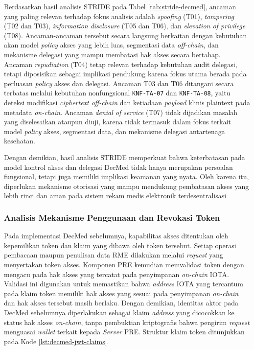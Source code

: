 \documentclass[bahasa, 12pt, a4paper, onecolumn, oneside, final]{report}
\begin{document}
Berdasarkan hasil analisis STRIDE pada Tabel \ref{tab:stride-decmed}, ancaman yang paling relevan terhadap fokus analisis adalah \textit{spoofing} (T01), \textit{tampering} (T02 dan T03), \textit{information disclosure} (T05 dan T06), dan \textit{elevation of privilege} (T08). Ancaman-ancaman tersebut secara langsung berkaitan dengan kebutuhan akan model \textit{policy} akses yang lebih luas, segmentasi data \textit{off-chain}, dan mekanisme delegasi yang mampu membatasi hak akses secara bertahap. Ancaman \textit{repudiation} (T04) tetap relevan terhadap kebutuhan audit delegasi, tetapi diposisikan sebagai implikasi pendukung karena fokus utama berada pada perluasan \textit{policy} akses dan delegasi. Ancaman T03 dan T06 ditangani secara terbatas melalui kebutuhan nonfungsional \texttt{KNF-TA-07} dan \texttt{KNF-TA-08}, yaitu deteksi modifikasi \textit{ciphertext} \textit{off-chain} dan ketiadaan \textit{payload} klinis plaintext pada metadata \textit{on-chain}. Ancaman \textit{denial of service} (T07) tidak dijadikan masalah yang diselesaikan ataupun diuji, karena tidak termasuk dalam fokus terkait model \textit{policy} akses, segmentasi data, dan mekanisme delegasi antartenaga kesehatan.

Dengan demikian, hasil analisis STRIDE memperkuat bahwa keterbatasan pada model kontrol akses dan delegasi DecMed tidak hanya merupakan persoalan fungsional, tetapi juga memiliki implikasi keamanan yang nyata. Oleh karena itu, diperlukan mekanisme otorisasi yang mampu mendukung pembatasan akses yang lebih rinci dan aman pada sistem rekam medis elektronik terdesentralisasi \subsubsection{Analisis Mekanisme Penggunaan dan Revokasi Token}
\label{subsubsec:analisis-mekanisme-penggunaan-dan-revokasi-akses}

Pada implementasi DecMed sebelumnya, kapabilitas akses ditentukan oleh kepemilikan token dan klaim yang dibawa oleh token tersebut. Setiap operasi pembacaan maupun penulisan data RME dilakukan melalui \textit{request} yang menyertakan token akses. Komponen PRE kemudian memvalidasi token dengan mengacu pada hak akses yang tercatat pada penyimpanan \textit{on-chain} IOTA. Validasi ini digunakan untuk memastikan bahwa \textit{address} IOTA yang tercantum pada klaim token memiliki hak akses yang sesuai pada penyimpanan \textit{on-chain} dan hak akses tersebut masih berlaku. Dengan demikian, identitas aktor pada DecMed sebelumnya diperlakukan sebagai klaim \textit{address} yang dicocokkan ke status hak akses \textit{on-chain}, tanpa pembuktian kriptografis bahwa pengirim \textit{request} menguasai \textit{wallet} terkait kepada \textit{Server} PRE. Struktur klaim token ditunjukkan pada Kode \ref{lst:decmed-jwt-claims}.
\end{document}
